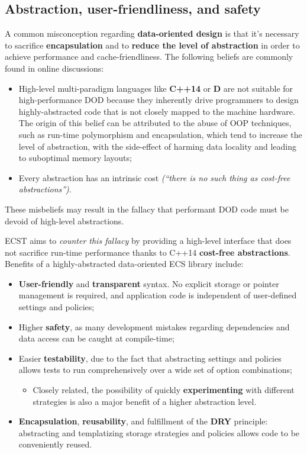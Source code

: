 \documentclass[twoside, 12pt, a4paper, openright]{book}
\providecommand{\tightlist}{%
  \setlength{\itemsep}{0pt}\setlength{\parskip}{0pt}}
\begin{document}
\subsection{Abstraction, user-friendliness, and
safety}\label{abstraction-user-friendliness-and-safety}

A common misconception regarding \textbf{data-oriented design} is that
it's necessary to sacrifice \textbf{encapsulation} and to \textbf{reduce
the level of abstraction} in order to achieve performance and
cache-friendliness. The following beliefs are commonly found in online
discussions:

\begin{itemize}
\item
  High-level multi-paradigm languages like \textbf{C++14} or \textbf{D}
  are not suitable for high-performance DOD because they inherently
  drive programmers to design highly-abstracted code that is not closely
  mapped to the machine hardware. The origin of this belief can be
  attributed to the abuse of OOP techniques, such as run-time
  polymorphism and encapsulation, which tend to increase the level of
  abstraction, with the side-effect of harming data locality and leading
  to suboptimal memory layouts;
\item
  Every abstraction has an intrinsic cost \emph{(``there is no such
  thing as cost-free abstractions'')}.
\end{itemize}

These misbeliefs may result in the fallacy that performant DOD code must
be devoid of high-level abstractions.

ECST aims to \emph{counter this fallacy} by providing a high-level
interface that does not sacrifice run-time performance thanks to C++14
\textbf{cost-free abstractions}. Benefits of a highly-abstracted
data-oriented ECS library include:

\begin{itemize}
\item
  \textbf{User-friendly} and \textbf{transparent} syntax. No explicit
  storage or pointer management is required, and application code is
  independent of user-defined settings and policies;
\item
  Higher \textbf{safety}, as many development mistakes regarding
  dependencies and data access can be caught at compile-time;
\item
  Easier \textbf{testability}, due to the fact that abstracting settings
  and policies allows tests to run comprehensively over a wide set of
  option combinations;

  \begin{itemize}
  \tightlist
  \item
    Closely related, the possibility of quickly \textbf{experimenting}
    with different strategies is also a major benefit of a higher
    abstraction level.
  \end{itemize}
\item
  \textbf{Encapsulation}, \textbf{reusability}, and fulfillment of the
  \textbf{DRY} principle: abstracting and templatizing storage
  strategies and policies allows code to be conveniently reused.
\end{itemize}
\end{document}

